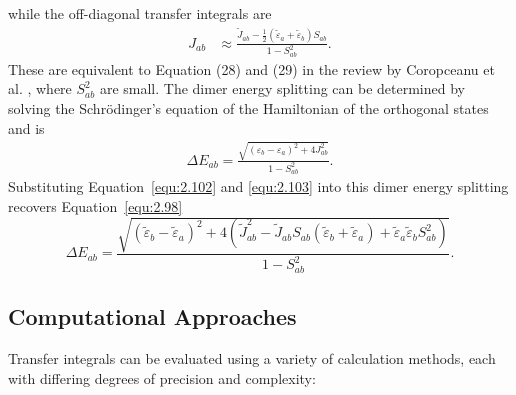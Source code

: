while the off-diagonal transfer integrals are
\begin{equation} \label{equ:2.103}
\begin{split} 
J_{ab}&\approx \frac{\tilde{J}_{ab}-\frac{1}{2}(\tilde{\varepsilon}_{a}+\tilde{\varepsilon}_{b})S_{ab}}{1-S_{ab}^{2}}.
\end{split}
\end{equation}
These are equivalent to Equation (28) and (29) in the review by Coropceanu et al. \cite{Coropceanu2007}, where $S_{ab}^{2}$ are small.
The dimer energy splitting can be determined by solving the Schr\"{o}dinger's equation of the Hamiltonian of the orthogonal states and is
\begin{equation} \label{equ:2.104}
\begin{split}
\Delta E_{ab} = \frac{
\sqrt{
(\varepsilon_b - \varepsilon_a)^2 + 4J_{ab}^2}}{1 - S_{ab}^2}.
\end{split}
\end{equation}
Substituting Equation~\eqref{equ:2.102} and \eqref{equ:2.103} into this dimer energy splitting recovers Equation~\eqref{equ:2.98}
\[
\Delta E_{ab} = \frac{
\sqrt{
(\tilde{\varepsilon}_b - \tilde{\varepsilon}_a)^2 + 4\left( \tilde{J}_{ab}^2 - \tilde{J}_{ab} S_{ab} (\tilde{\varepsilon}_b + \tilde{\varepsilon}_a) + \tilde{\varepsilon}_a \tilde{\varepsilon}_b S_{ab}^2 \right)
}
}{1 - S_{ab}^2}.
\]

\subsection{Computational Approaches} \label{subsec:2.6.3}

Transfer integrals can be evaluated using a variety of calculation methods, each with differing degrees of precision and complexity:

